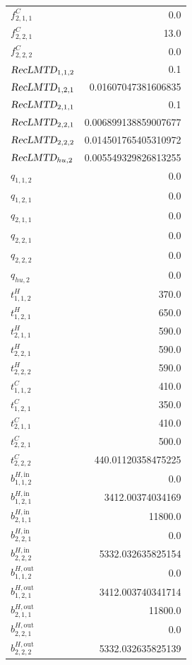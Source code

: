 \documentclass{article}%
\begin{document}
\begin{multicols*}{3}
\begin{supertabular}{lr}
	$f_{2,1,1}^{C}$ & 0.0 \\%
	$f_{2,2,1}^{C}$ & 13.0 \\%
	$f_{2,2,2}^{C}$ & 0.0 \\%
	$\textsl{RecLMTD}_{1,1,2}$ & 0.1 \\%
	$\textsl{RecLMTD}_{1,2,1}$ & 0.01607047381606835 \\%
	$\textsl{RecLMTD}_{2,1,1}$ & 0.1 \\%
	$\textsl{RecLMTD}_{2,2,1}$ & 0.006899138859007677 \\%
	$\textsl{RecLMTD}_{2,2,2}$ & 0.014501765405310972 \\%
	$\textsl{RecLMTD}_{hu,2}$ & 0.005549329826813255 \\%
	$q_{1,1,2}$ & 0.0 \\%
	$q_{1,2,1}$ & 0.0 \\%
	$q_{2,1,1}$ & 0.0 \\%
	$q_{2,2,1}$ & 0.0 \\%
	$q_{2,2,2}$ & 0.0 \\%
	$q_{hu,2}$ & 0.0 \\%
	$t_{1,1,2}^{H}$ & 370.0 \\%
	$t_{1,2,1}^{H}$ & 650.0 \\%
	$t_{2,1,1}^{H}$ & 590.0 \\%
	$t_{2,2,1}^{H}$ & 590.0 \\%
	$t_{2,2,2}^{H}$ & 590.0 \\%
	$t_{1,1,2}^{C}$ & 410.0 \\%
	$t_{1,2,1}^{C}$ & 350.0 \\%
	$t_{2,1,1}^{C}$ & 410.0 \\%
	$t_{2,2,1}^{C}$ & 500.0 \\%
	$t_{2,2,2}^{C}$ & 440.01120358475225 \\%
	$b_{1,1,2}^{H,\text{in}}$ & 0.0 \\%
	$b_{1,2,1}^{H,\text{in}}$ & 3412.00374034169 \\%
	$b_{2,1,1}^{H,\text{in}}$ & 11800.0 \\%
	$b_{2,2,1}^{H,\text{in}}$ & 0.0 \\%
	$b_{2,2,2}^{H,\text{in}}$ & 5332.032635825154 \\%
	$b_{1,1,2}^{H,\text{out}}$ & 0.0 \\%
	$b_{1,2,1}^{H,\text{out}}$ & 3412.003740341714 \\%
	$b_{2,1,1}^{H,\text{out}}$ & 11800.0 \\%
	$b_{2,2,1}^{H,\text{out}}$ & 0.0 \\%
	$b_{2,2,2}^{H,\text{out}}$ & 5332.032635825139 \\%

\end{supertabular}
\end{multicols*}
\end{document}
